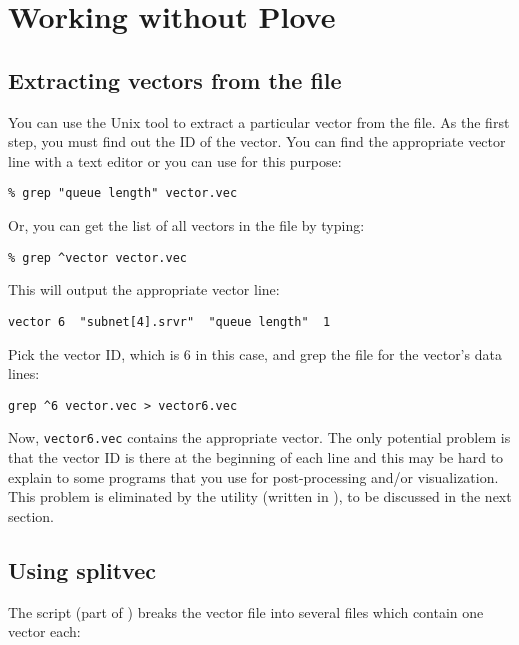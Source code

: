 \section{Working without Plove}

\subsection{Extracting vectors from the file}

You can use the Unix  tool to extract a particular vector
from the file. As the first step, you must find out the ID of the
vector. You can find the appropriate vector line with a text editor or
you can use  for this purpose:

\begin{verbatim}
% grep "queue length" vector.vec
\end{verbatim}

Or, you can get the list of all vectors in the file by typing:

\begin{verbatim}
% grep ^vector vector.vec
\end{verbatim}

This will output the appropriate vector line:

\begin{verbatim}
vector 6  "subnet[4].srvr"  "queue length"  1
\end{verbatim}

Pick the vector ID, which is 6 in this case, and grep the file
for the vector's data lines:

\begin{verbatim}
grep ^6 vector.vec > vector6.vec
\end{verbatim}


Now, \texttt{vector6.vec} contains the appropriate vector. The only
potential problem is that the vector ID is there at the beginning of
each line and this may be hard to explain to some programs that you
use for post-processing and/or visualization. This problem is
eliminated by the {\opp}  utility (written in
), to be discussed in the next section.




\subsection{Using splitvec}

The  script (part of {\opp}) breaks the vector file
into several files which contain one vector each:

